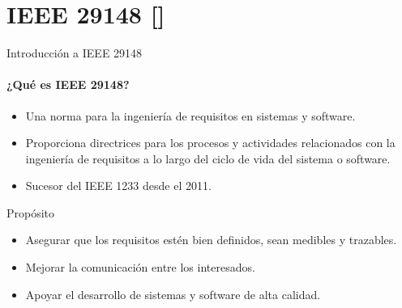 \documentclass[
  24pt, %
  aspectratio=169, %
]{beamer}
\begin{document}
\section{IEEE 29148 [\cite{ieee}]}
\begin{frame}{Introducción a IEEE 29148}
\framesubtitle{¿Qué es IEEE 29148?}
\begin{itemize}
    \item Una norma para la ingeniería de requisitos en sistemas y software.
    \item Proporciona directrices para los procesos y actividades relacionados con la ingeniería de requisitos a lo largo del ciclo de vida del sistema o software.
      \item Sucesor del IEEE 1233 desde el 2011.
\end{itemize}
\bigskip %
Propósito
\begin{itemize}
    \item Asegurar que los requisitos estén bien definidos, sean medibles y trazables.
    \item Mejorar la comunicación entre los interesados.
    \item Apoyar el desarrollo de sistemas y software de alta calidad.
\end{itemize}
\end{frame}


\end{document}
